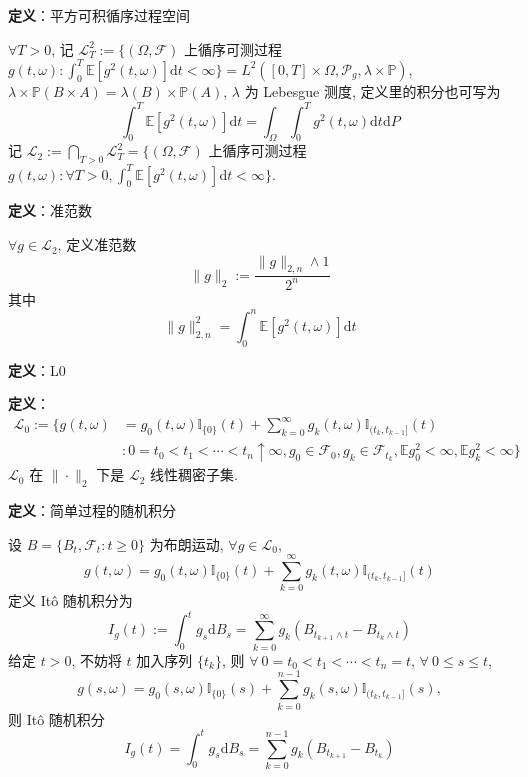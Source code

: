 \documentclass[openany]{ctexbook}
\theoremstyle{kaiti}
\theoremstyle{normal}
\begin{document}
\textbf{定义}：平方可积循序过程空间

$\forall T>0$, 记 $\mathcal{L}_T^2:=\bigg\{(\Omega,\mathcal{F})$ 上循序可测过程 $g(t,\omega): \displaystyle\int_0^T\mathbb{E}[g^2(t,\omega)]\mathrm{d}t<\infty\bigg\}=L^2([0,T]\times\Omega,\mathcal{P}_g,\lambda\times \mathbb{P})$, $\lambda\times \mathbb{P}(B\times A)=\lambda(B)\times \mathbb{P}(A)$, $\lambda$ 为 Lebesgue 测度, 定义里的积分也可写为
\begin{equation}
  \int_0^T\mathbb{E}[g^2(t,\omega)]\mathrm{d}t=\int_\Omega\int_0^Tg^2(t,\omega)\mathrm{d}t\mathrm{d}P
\end{equation}
记 $\mathcal{L}_2:=\bigcap\limits_{T>0}\mathcal{L}_T^2=\bigg\{(\Omega,\mathcal{F})$ 上循序可测过程 $g(t,\omega): \forall T>0, \displaystyle\int_0^T\mathbb{E}[g^2(t,\omega)]\mathrm{d}t<\infty\bigg\}$.

\textbf{定义}：准范数

$\forall g\in\mathcal{L}_2$, 定义准范数
\begin{equation}
  \|g\|_2:=\frac{\|g\|_{2,n}\wedge1}{2^n}
\end{equation}
其中
\begin{equation}
  \|g\|_{2,n}^2=\int_0^n\mathbb{E}[g^2(t,\omega)]\mathrm{d}t
\end{equation}

\textbf{定义}：L0

\textbf{定义}：\begin{equation}\begin{aligned}\mathcal{L}_0:=\Bigg\{g(t,\omega)&=g_0(t,\omega)\mathbb{I}_{\{0\}}(t)+\sum_{k=0}^\infty g_k(t,\omega)\mathbb{I}_{(t_k,t_{k-1}]}(t)\\&:0=t_0<t_1<\cdots<t_n\uparrow\infty,g_0\in\mathcal{F}_0,g_k\in\mathcal{F}_{t_k},\mathbb{E}g_0^2<\infty,\mathbb{E}g_k^2<\infty\Bigg\}\end{aligned}\end{equation} $\mathcal{L}_0$ 在 $\|\cdot\|_2$ 下是 $\mathcal{L}_2$ 线性稠密子集.

\textbf{定义}：简单过程的随机积分

设 $B=\{B_t,\mathcal{F}_t:t\geqslant0\}$ 为布朗运动, $\forall g\in\mathcal{L}_0$,
\begin{equation}
  g(t,\omega)=g_0(t,\omega)\mathbb{I}_{\{0\}}(t)+\sum_{k=0}^\infty g_k(t,\omega)\mathbb{I}_{(t_k,t_{k-1}]}(t)
\end{equation}
定义 It\^o 随机积分为
\begin{equation}
  I_g(t):=\int_0^tg_s\mathrm{d}B_s=\sum_{k=0}^\infty g_k(B_{t_{k+1}\wedge t}-B_{t_{k}\wedge t})
\end{equation}
给定 $t>0$, 不妨将 $t$ 加入序列 $\{t_k\}$, 则 $\forall~ 0=t_0<t_1<\cdots<t_n=t$, $\forall~ 0\leqslant s\leqslant t$,
\begin{equation}
  g(s,\omega)=g_0(s,\omega)\mathbb{I}_{\{0\}}(s)+\sum_{k=0}^{n-1} g_k(s,\omega)\mathbb{I}_{(t_k,t_{k-1}]}(s),
\end{equation}
则 It\^o 随机积分
\begin{equation}
  I_g(t)=\int_0^tg_s\mathrm{d}B_s=\sum_{k=0}^{n-1}g_k(B_{t_{k+1}}-B_{t_k})
\end{equation}
\end{document}
